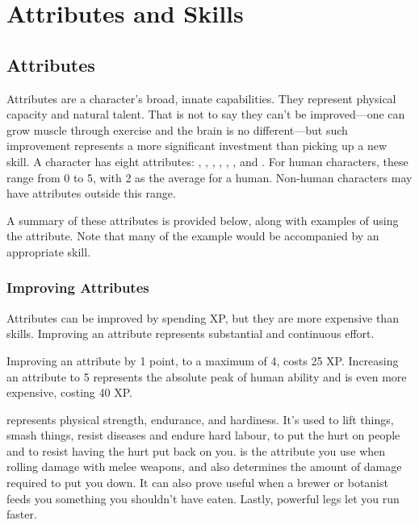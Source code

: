 \chapter{Attributes and Skills}

\section{Attributes}

Attributes are a character's broad, innate capabilities.
They represent physical capacity and natural talent.
That is not to say they can't be improved---one can grow muscle through exercise and the brain is no different---but such improvement represents a more significant investment than picking up a new skill.
A character has eight attributes: , , , , , ,  and .
For human characters, these range from 0 to 5, with 2 as the average for a human.
Non-human characters may have attributes outside this range.

A summary of these attributes is provided below, along with examples of using the attribute.
Note that many of the example {\tests} would be accompanied by an appropriate skill.

\subsection{Improving Attributes}

Attributes can be improved by spending XP, but they are more expensive than skills.
Improving an attribute represents substantial and continuous effort.

Improving an attribute by 1 point, to a maximum of 4, costs 25 XP.
Increasing an attribute to 5 represents the absolute peak of human ability and is even more expensive, costing 40 XP.


 represents physical strength, endurance, and hardiness.
It's used to lift things, smash things, resist diseases and endure hard labour, to put the hurt on people and to resist having the hurt put back on you.
 is the attribute you use when rolling damage with melee weapons, and also determines the amount of damage required to put you down.
It can also prove useful when a brewer or botanist feeds you something you shouldn't have eaten.
Lastly, powerful legs let you run faster.

